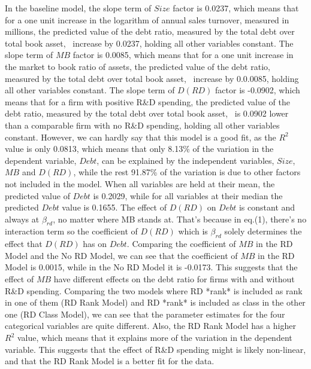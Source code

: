\documentclass[12pt, times]{article}
\begin{document}
In the baseline model, the slope term of $Size$ factor is 0.0237, 
which means that for a one unit increase in the logarithm of annual sales turnover, 
measured in millions, the predicted value of the debt ratio, measured by the total debt over total book asset, \
increase by 0.0237, holding all other variables constant.
The slope term of $MB$ factor is 0.0085, which means that for a one unit increase in the market to book ratio of assets, 
the predicted value of the debt ratio, measured by the total debt over total book asset, \
increase by 0.0.0085, holding all other variables constant.
The slope term of $D(RD)$ factor is -0.0902, which means that for a firm with positive R\&D spending, 
the predicted value of the debt ratio, measured by the total debt over total book asset, \
is 0.0902 lower than a comparable firm with no R\&D spending, holding all other variables constant.
\newline
However, we can hardly say that this model is a good fit, as the $R^2$ value is only 0.0813, which means that only 8.13\% of the
variation in the dependent variable, $Debt$, can be explained by the independent variables, $Size$, $MB$ and $D(RD)$,
while the rest 91.87\% of the variation is due to other factors not included in the model.
\newline
When all variables are held at their mean, the predicted value of $Debt$ is 0.2029, while for all variables at their 
median the predicted $Debt$ value is 0.1655.
\newline
The effect of $D(RD)$ on $Debt$ is constant and always at $\beta_{rd}$, no matter where MB stands at.
That's because in eq.(1), there's no interaction term so the coefficient of $D(RD)$ which is $\beta_{rd}$ solely determines the effect
that $D(RD)$ has on $Debt$.
\newline
Comparing the coefficient of $MB$ in the RD Model and the No RD Model, 
we can see that the coefficient of $MB$ in the RD Model is 0.0015, while 
in the No RD Model it is -0.0173. This suggests that the effect of $MB$ have different
effects on the debt ratio for firms with and without R\&D spending. 
\newline
Comparing the two models where RD *rank* is included as rank in one of them (RD Rank Model)
and RD *rank* is included as class in the other one (RD Class Model), we can see that the parameter
estimates for the four categorical variables are quite different. Also, the
 RD Rank Model has a higher $R^2$ value, which means that it explains more of the 
 variation in the dependent variable. This suggests that the effect of R\&D spending
 might is likely non-linear, and that the RD Rank Model is a better fit for the data.
\end{document}
